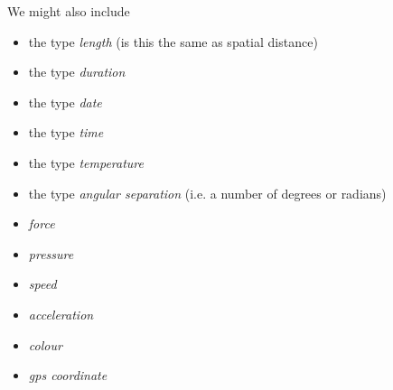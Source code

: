 \mynote We might also include
\begin{itemize}
	\item the type \textit{length} (is this the same as spatial distance)
	\item the type \textit{duration}
	\item the type \textit{date}
	\item the type \textit{time}
	\item the type \textit{temperature}
	\item the type \textit{angular separation} (i.e. a number of degrees or radians)
	\item \textit{force}
	\item \textit{pressure}
	\item \textit{speed}
	\item \textit{acceleration}
	\item \textit{colour}
	\item \textit{gps coordinate}
\end{itemize}